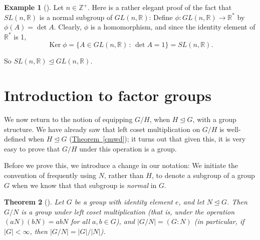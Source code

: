 \documentclass[10pt,]{book}
\theoremstyle{plain}
\newtheorem{theorem}{Theorem}[section]
\theoremstyle{definition}
\theoremstyle{definition}
\theoremstyle{definition}
\newtheorem{example}[theorem]{Example}
\theoremstyle{definition}
\numberwithin{equation}{section}
\def\Z{\mathbb{Z}}
\def\R{\mathbb{R}}
\DeclareMathOperator{\Ker}{Ker}
\newcommand{\lt}{<}
\begin{document}
\begin{example}[]\label{slnormgl}
Let \(n\in \Z^+\). Here is a rather elegant proof of the fact that \(SL(n,\R)\) is a normal subgroup of \(GL(n,\R)\): Define \(\phi:
GL(n,\R) \to \R^*\) by \(\phi(A)=\det A\). Clearly, \(\phi\) is a homomorphism, and since the identity element of \(\R^*\) is 1,%
\begin{equation*}
\Ker \phi=\{A\in GL(n,\R)\,:\,\det A= 1\}=SL(n,\R).
\end{equation*}
%
\par
So \(SL(n,\R)\unlhd GL(n,\R)\).%
\end{example}
\typeout{************************************************}
\typeout{************************************************}
\section[{Introduction to factor groups}]{Introduction to factor groups}\label{section-27}
We now return to the notion of equipping \(G/H\), when \(H\unlhd G\), with a group structure. We have already saw that left coset multiplication on \(G/H\) is well-defined when \(H\unlhd G\) (\hyperref[cmwd]{Theorem~\ref{cmwd}}); it turns out that given this, it is very easy to prove that \(G/H\) under this operation is a group.%
\par
Before we prove this, we introduce a change in our notation: We initiate the convention of frequently using \(N\), rather than \(H\), to denote a subgroup of a group \(G\) when we know that that subgroup is \emph{normal} in \(G\).%
\begin{theorem}[{}]\label{theorem-57}
Let \(G\) be a group with identity element \(e\), and let \(N\unlhd G\). Then \(G/N\) is a group under left coset multiplication (that is, under the operation \((aN)(bN)=abN\) for all \(a,b\in G\)), and \(|G/N|=(G:N)\) (in particular, if \(|G|\lt \infty\), then \(|G/N|=|G|/|N|\)).%
\end{theorem}
\end{document}
